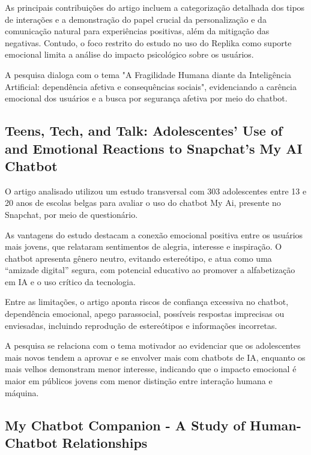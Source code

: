 \documentclass[12pt]{article}
\begin{document}
As principais contribuições do artigo incluem a categorização detalhada dos tipos de interações e a demonstração do papel crucial da personalização e da comunicação natural para experiências positivas, além da mitigação das negativas. Contudo, o foco restrito do estudo no uso do Replika como suporte emocional limita a análise do impacto psicológico sobre os usuários.

A pesquisa dialoga com o tema "A Fragilidade Humana diante da Inteligência Artificial: dependência afetiva e consequências sociais", evidenciando a carência emocional dos usuários e a busca por segurança afetiva por meio do chatbot.\cite{loveinalgoritmos}

\subsection{Teens, Tech, and Talk: Adolescentes' Use of and Emotional Reactions to Snapchat's My AI Chatbot}

O artigo analisado utilizou um estudo transversal com 303 adolescentes entre 13 e 20 anos de escolas belgas para avaliar o uso do chatbot My Ai, presente no Snapchat, por meio de questionário.

As vantagens do estudo destacam a conexão emocional positiva entre os usuários mais jovens, que relataram sentimentos de alegria, interesse e inspiração. O chatbot apresenta gênero neutro, evitando estereótipo, e atua como uma “amizade digital” segura, com potencial educativo ao promover a alfabetização em IA e o uso crítico da tecnologia.

Entre as limitações, o artigo aponta riscos de confiança excessiva no chatbot, dependência emocional, apego parassocial, possíveis respostas imprecisas ou enviesadas, incluindo reprodução de estereótipos e informações incorretas.

A pesquisa se relaciona com o tema motivador ao evidenciar que os adolescentes mais novos tendem a aprovar e se envolver mais com chatbots de IA, enquanto os mais velhos demonstram menor interesse, indicando que o impacto emocional é maior em públicos jovens com menor distinção entre interação humana e máquina.\cite{teenstech}

\subsection{My Chatbot Companion - A Study of Human-Chatbot Relationships}
\end{document}
